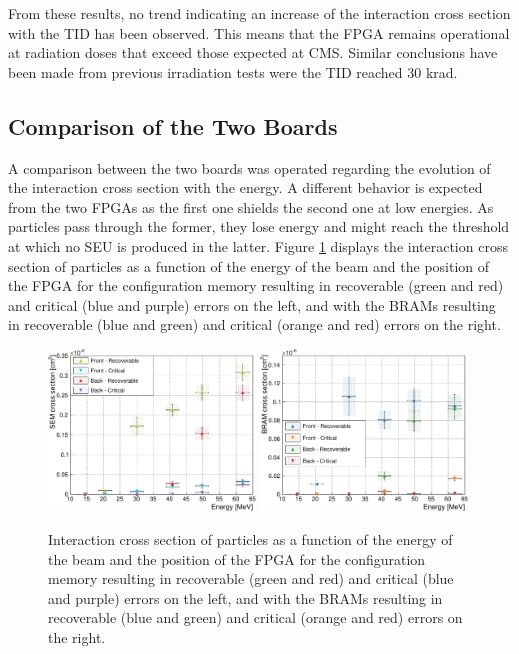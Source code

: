       From these results, no trend indicating an increase of the interaction cross section with the TID has been observed. This means that the FPGA remains operational at radiation doses that exceed those expected at CMS. Similar conclusions have been made from previous irradiation tests \cite{Bylsma2013242} were the TID reached 30 krad.

    \subsection{Comparison of the Two Boards}

      A comparison between the two boards was operated regarding the evolution of the interaction cross section with the energy. A different behavior is expected from the two FPGAs as the first one shields the second one at low energies. As particles pass through the former, they lose energy and might reach the threshold at which no SEU is produced in the latter. Figure \ref{fig:II-5-data-seu-comp} displays the interaction cross section of particles as a function of the energy of the beam and the position of the FPGA for the configuration memory resulting in recoverable (green and red) and critical (blue and purple) errors on the left, and with the BRAMs resulting in recoverable (blue and green) and critical (orange and red) errors on the right. \\

      \begin{figure}[h!]
        \centering
        \includegraphics[width=0.49\textwidth]{img/plots/cE_SEU_Comp-crop}
        \includegraphics[width=0.49\textwidth]{img/plots/cE_BRAM_Comp-crop}
        \caption{Interaction cross section of particles as a function of the energy of the beam and the position of the FPGA for the configuration memory resulting in recoverable (green and red) and critical (blue and purple) errors on the left, and with the BRAMs resulting in recoverable (blue and green) and critical (orange and red) errors on the right.}
        \label{fig:II-5-data-seu-comp}
      \end{figure}

